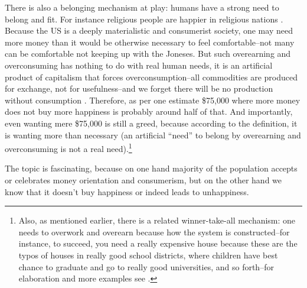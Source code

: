 \documentclass[10pt, letterpaper]{article}
\begin{document}
\begin{spacing}{1.8}
There is also a belonging mechanism at play: humans have a strong need to belong and
fit. For instance religious people are happier in religious nations
\citep{aokrel}. Because the US is a deeply materialistic and consumerist society,
one may need more money than it would be otherwise necessary to feel comfortable--not
many can be comfortable not keeping up with the Joneses. But such overearning
and overconsuming has nothing to do with real human needs, it is an artificial
product of capitalism that forces overconsumption--all commodities are produced
for exchange, not for usefulness--and we forget there will be no production
without consumption \citep{marx1844-human-requirements}. Therefore, as per one estimate \$75,000 where
more money does not buy more happiness \citep{kahneman10} is probably around
half of that. And importantly, even wanting mere \$75,000 is still a greed,
because according to the definition, it is wanting more than necessary (an
artificial ``need'' to belong by overearning and overconsuming is not a real
need).\footnote{Also, as mentioned earlier, there is a related winner-take-all
  mechanism: one needs to overwork and overearn because how the system is
  constructed--for instance, to succeed, you need a really expensive house
  because these are the typos of houses in really good school districts, where
  children have best chance to graduate and go to really good universities, and
  so forth--for elaboration and more examples see \citet{frank12}.}

The topic is fascinating, because on one hand majority of the population accepts
or celebrates money orientation and consumerism, but on the other hand we know
that it doesn't buy happiness or indeed leads to unhappiness.
%
%
%


\end{spacing}
\end{document}

